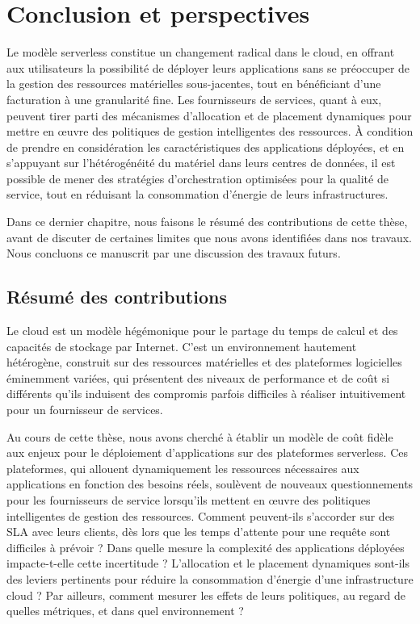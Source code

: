 \chapter{Conclusion et perspectives}
\label{chapter:conclusion}

Le modèle serverless constitue un changement radical dans le cloud, en offrant aux utilisateurs la possibilité de déployer leurs applications sans se préoccuper de la gestion des ressources matérielles sous-jacentes, tout en bénéficiant d'une facturation à une granularité fine. Les fournisseurs de services, quant à eux, peuvent tirer parti des mécanismes d'allocation et de placement dynamiques pour mettre en œuvre des politiques de gestion intelligentes des ressources. À condition de prendre en considération les caractéristiques des applications déployées, et en s'appuyant sur l'hétérogénéité du matériel dans leurs centres de données, il est possible de mener des stratégies d'orchestration optimisées pour la qualité de service, tout en réduisant la consommation d'énergie de leurs infrastructures.

Dans ce dernier chapitre, nous faisons le résumé des contributions de cette thèse, avant de discuter de certaines limites que nous avons identifiées dans nos travaux. Nous concluons ce manuscrit par une discussion des travaux futurs.

\section{Résumé des contributions}
\label{section:conclusion-summary}

Le cloud est un modèle hégémonique pour le partage du temps de calcul et des capacités de stockage par Internet. C'est un environnement hautement hétérogène, construit sur des ressources matérielles et des plateformes logicielles éminemment variées, qui présentent des niveaux de performance et de coût si différents qu'ils induisent des compromis parfois difficiles à réaliser intuitivement pour un fournisseur de services.

Au cours de cette thèse, nous avons cherché à établir un modèle de coût fidèle aux enjeux pour le déploiement d'applications sur des plateformes serverless. Ces plateformes, qui allouent dynamiquement les ressources nécessaires aux applications en fonction des besoins réels, soulèvent de nouveaux questionnements pour les fournisseurs de service lorsqu'ils mettent en œuvre des politiques intelligentes de gestion des ressources. Comment peuvent-ils s'accorder sur des \gls{SLA} avec leurs clients, dès lors que les temps d'attente pour une requête sont difficiles à prévoir ? Dans quelle mesure la complexité des applications déployées impacte-t-elle cette incertitude ? L'allocation et le placement dynamiques sont-ils des leviers pertinents pour réduire la consommation d'énergie d'une infrastructure cloud ? Par ailleurs, comment mesurer les effets de leurs politiques, au regard de quelles métriques, et dans quel environnement ?

